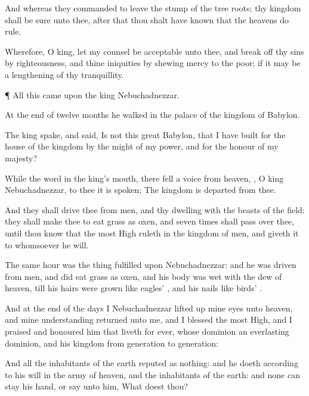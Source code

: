 {And whereas they
commanded to
leave the
stump of the
tree
roots; thy
kingdom shall be
sure unto thee,
after that thou shalt have
known that the
heavens do
rule.

Wherefore, O
king, let my
counsel be
acceptable unto
thee, and break
off thy
sins by
righteousness, and thine
iniquities by shewing
mercy to the
poor;
if it may
be a
lengthening of thy
tranquillity.


\par }{\PP {}¶
All this
came
upon the
king
Nebuchadnezzar.

At the
end of
twelve
months he
walked
in the
palace of the
kingdom of
Babylon.

The
king
spake, and
said, Is
not
this
great
Babylon, that
I have
built for the
house of the
kingdom by the
might of my
power, and for the
honour of my
majesty?

While the
word
{} in the
king’s
mouth, there
fell a
voice
from
heaven,
{}, O
king
Nebuchadnezzar, to thee it is
spoken; The
kingdom is
departed
from thee.

And they shall
drive thee
from
men, and thy
dwelling
{}
with the
beasts of the
field: they shall make thee to
eat
grass as
oxen, and
seven
times shall
pass
over thee,
until thou
know that the most
High
ruleth in the
kingdom of
men, and
giveth it to
whomsoever he
will.

The same
hour was the
thing
fulfilled
upon
Nebuchadnezzar: and he was
driven
from
men, and did
eat
grass as
oxen, and his
body was
wet with the
dew of
heaven,
till his
hairs were
grown like
eagles’
{}, and his
nails like
birds’
{}.


\par }{\PP {}And at the
end of the
days
I
Nebuchadnezzar lifted
up mine
eyes unto
heaven, and mine
understanding
returned unto
me, and I
blessed the most
High, and I
praised and
honoured him that
liveth for
ever, whose
dominion
{} an
everlasting
dominion, and his
kingdom
{}
from
generation to
generation:

And
all the
inhabitants of the
earth
{}
reputed as
nothing: and he
doeth according to his
will in the
army of
heaven, and
{} the
inhabitants of the
earth: and
none
can
stay his
hand, or
say unto him,
What
doest thou?

}
